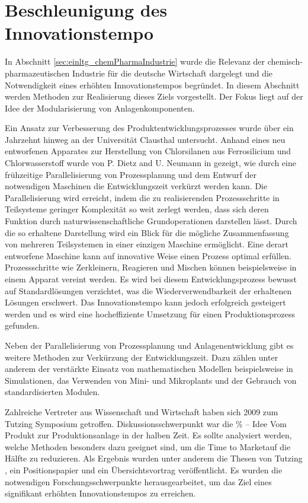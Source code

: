\section{Beschleunigung des Innovationstempo}\label{sec:einltg_beschlngInnovationstempo}
In Abschnitt \ref{sec:einltg_chemPharmaIndustrie} wurde die Relevanz der chemisch-pharmazeutischen Industrie f\"ur die deutsche Wirtschaft dargelegt und die Notwendigkeit eines erh\"ohten Innovationstempos begr\"undet. In diesem Abschnitt werden Methoden zur Realisierung dieses Ziels vorgestellt. Der Fokus liegt auf der Idee der Modularisierung von Anlagenkomponenten.

Ein Ansatz zur Verbesserung des Produktentwicklungsprozesses wurde \"uber ein Jahrzehnt hinweg an der Universit\"at Clausthal untersucht. Anhand eines neu entworfenen Apparates zur Herstellung von Chlorsilanen aus Ferrosilicium und Chlorwasserstoff wurde von P. Dietz and U.  Neumann in \cite{Dietz_2000} gezeigt, wie durch eine fr\"uhzeitige Parallelisierung von Prozessplanung und dem Entwurf der notwendigen Maschinen die Entwicklungszeit verk\"urzt werden kann. Die Parallelisierung wird erreicht, indem die zu realisierenden Prozessschritte in Teilsysteme geringer Komplexit\"at so weit zerlegt werden, dass sich deren Funktion durch naturwissenschaftliche Grundoperationen darstellen l\"asst. Durch die so erhaltene Darstellung wird ein Blick f\"ur die m\"ogliche Zusammenfassung von mehreren Teilsystemen in einer einzigen Maschine erm\"oglicht. Eine derart entworfene Maschine kann auf innovative Weise einen Prozess optimal erf\"ullen. Prozessschritte wie Zerkleinern, Reagieren und Mischen k\"onnen beispielsweise in einem Apparat vereint werden. Es wird bei diesem Entwicklungsprozess bewusst auf Standardl\"osungen verzichtet, was die Wiederverwendbarkeit der erhaltenen L\"osungen  erschwert. Das Innovationstempo kann jedoch erfolgreich gesteigert werden und es wird eine hocheffiziente Umsetzung f\"ur einen  Produktionsprozess gefunden. 

Neben der Parallelisierung von Prozessplanung und Anlagenentwicklung gibt es weitere Methoden zur Verk\"urzung der Entwicklungszeit. Dazu z\"ahlen unter anderem der verst\"arkte Einsatz von mathematischen Modellen beispielsweise in Simulationen, das Verwenden von Mini- und Mikroplants und der Gebrauch von standardisierten Modulen.


Zahlreiche Vertreter aus Wissenschaft und Wirtschaft haben sich 2009 zum Tutzing Symposium getroffen. Diskussionsschwerpunkt war die \% -- Idee Vom Produkt zur Produktionsanlage in der halben Zeit\grqq { }. Es sollte analysiert werden, welche Methoden besonders dazu geeignet sind, um die \glqq Time to Market\grqq { }auf die H\"alfte zu reduzieren. Als Ergebnis wurden unter anderem die Thesen von Tutzing \cite{Processnet_2009}, ein Positionspapier \cite{Processnet_2010} und ein \"Ubersichtsvortrag \cite{Schembecker_2009} ver\"offentlicht. Es wurden die notwendigen Forschungsschwerpunkte herausgearbeitet, um das Ziel eines signifikant erh\"ohten Innovationstempos zu erreichen.

